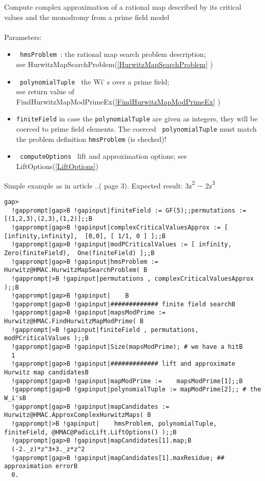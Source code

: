 \documentclass[a4paper,11pt]{report}
\begin{document}
{{{ Compute complex approximation of a rational map described by its critical
values and the monodromy from a prime field model \\
 \\
 Parameters: 
\begin{itemize}
\item \texttt{ hmsProblem }: the rational map search problem description; \\
 see HurwitzMapSearchProblem(\ref{HurwitzMapSearchProblem} ) 
\item \texttt{ polynomialTuple } the W{\textunderscore}i' s over a prime field; \\
 see return value of FindHurwitzMapModPrimeEx(\ref{FindHurwitzMapModPrimeEx} ) 
\item \texttt{finiteField} in case the \texttt{polynomialTuple} are given as integers, they will be coerced to prime field elements. The
coerced \texttt{ polynomialTuple} must match the problem definition \texttt{hmsProblem} (is checked)! 
\item \texttt{ computeOptions } lift and approximation options; see LiftOptions(\ref{LiftOptions}) 
\end{itemize}
 }

 Simple example as in article ..( page 3). Expected result:
3z{\textsuperscript2} {\ensuremath{-}} 2z{\textsuperscript3} \\
 
\begin{Verbatim}[commandchars=!|B,fontsize=\small,frame=single,label=Example]
  gap>
  !gapprompt|gap>B !gapinput|finiteField := GF(5);;permutations := [(1,2,3),(2,3),(1,2)];;B
  !gapprompt|gap>B !gapinput|complexCriticalValuesApprox := [ [infinity,infinity],  [0,0], [ 1/1, 0 ] ];;B
  !gapprompt|gap>B !gapinput|modPCriticalValues := [ infinity, Zero(finiteField),  One(finiteField) ];;B
  !gapprompt|gap>B !gapinput|hmsProblem := Hurwitz@HMAC.HurwitzMapSearchProblem( B
  !gapprompt|>B !gapinput|permutations , complexCriticalValuesApprox );;B
  !gapprompt|gap>B !gapinput|    B
  !gapprompt|gap>B !gapinput|############# finite field searchB
  !gapprompt|gap>B !gapinput|mapsModPrime := Hurwitz@HMAC.FindHurwitzMapModPrime( B
  !gapprompt|>B !gapinput|finiteField , permutations, modPCriticalValues );;B
  !gapprompt|gap>B !gapinput|Size(mapsModPrime); # we have a hitB
  1
  !gapprompt|gap>B !gapinput|############# lift and approximate Hurwitz map candidatesB
  !gapprompt|gap>B !gapinput|mapModPrime :=    mapsModPrime[1];;B
  !gapprompt|gap>B !gapinput|polynomialTuple := mapModPrime[2];; # the W_i'sB
  !gapprompt|gap>B !gapinput|mapCandidates := Hurwitz@HMAC.ApproxComplexHurwitzMaps( B
  !gapprompt|>B !gapinput|    hmsProblem, polynomialTuple, finiteField, @HMAC@PadicLift.LiftOptions() );;B
  !gapprompt|gap>B !gapinput|mapCandidates[1].map;B
  (-2._z)*z^3+3._z*z^2 
  !gapprompt|gap>B !gapinput|mapCandidates[1].maxResidue; ## approximation errorB
  0.
\end{Verbatim}
 }

 }
\end{document}
